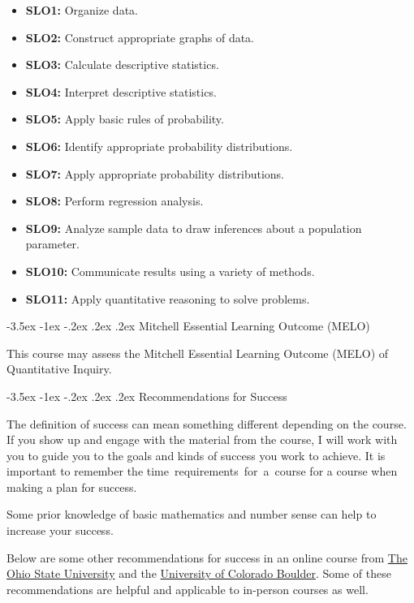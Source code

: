 \documentclass{article}
\makeatletter
\renewcommand\section{\@startsection{section}{1}{0pt}%
  {-3.5ex \@plus -1ex \@minus -.2ex}%
  {.2ex \@plus.2ex}%
  {\normalfont\Large\bfseries}} %
\makeatother
\begin{document}
\begin{itemize}
\item \textbf{SLO1:} Organize data.
\item \textbf{SLO2:} Construct appropriate graphs of data.
\item \textbf{SLO3:} Calculate descriptive statistics.
\item \textbf{SLO4:} Interpret descriptive statistics.
\item \textbf{SLO5:} Apply basic rules of probability.
\item \textbf{SLO6:} Identify appropriate probability distributions.
\item \textbf{SLO7:} Apply appropriate probability distributions.
\item \textbf{SLO8:} Perform regression analysis.
\item \textbf{SLO9:} Analyze sample data to draw inferences about a population parameter.
\item \textbf{SLO10:} Communicate results using a variety of methods.
\item \textbf{SLO11:} Apply quantitative reasoning to solve problems.
\end{itemize}

\section{Mitchell Essential Learning Outcome (MELO)}

This course may assess the Mitchell Essential Learning Outcome (MELO) of Quantitative Inquiry.

\section{Recommendations for Success}\label{recommendations-for-success}

The definition of success can mean something different depending on the course. If you show up and engage with the material from the course, I will work with you to guide you to the goals and kinds of success you work to achieve. It is important to remember the time~requirements~for~a~course for a course when making a plan for success.

Some prior knowledge of basic mathematics and number sense can help to increase your success.

Below are some other recommendations for success in an online course from \href{https://online.osu.edu/resources/learn/5-online-learning-tips-student-success}{The Ohio State University} and the \href{https://www.colorado.edu/health/tips-succeeding-online-classes}{University of Colorado Boulder}. Some of these recommendations are helpful and applicable to in-person courses as well.
\end{document}
